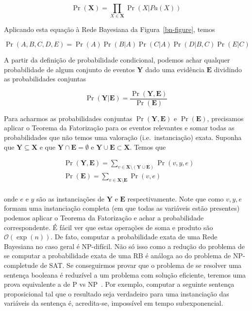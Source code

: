 \documentclass{amsart}
\theoremstyle{plain}
\numberwithin{equation}{subsection}
\newcommand{\set}[1]{\mathbf{#1}}
\newcommand{\bigo}{\mathcal{O}}
\begin{document}
\begin{equation*}
  \Pr(\set{X}) = \prod_{X\in\set{X}} \Pr(X|Pa(X))
\end{equation*}

Aplicando esta equação à Rede Bayesiana da Figura~\ref{bn-figure}, temos

\begin{equation*}
  \Pr(A,B,C,D,E) = \Pr(A)\Pr(B|A)\Pr(C|A)\Pr(D|B,C)\Pr(E|C)
\end{equation*}

A partir da definição de probabilidade condicional, podemos achar qualquer probabilidade de algum
conjunto de eventos $\set{Y}$ dado uma evidência $\set{E}$ dividindo as probabilidades conjuntas

\begin{equation*}
  \Pr(\set{Y}|\set{E}) = \frac{\Pr(\set{Y},\set{E})}{\Pr(\set{E})}
\end{equation*}

Para acharmos as probabilidades conjuntas $\Pr(\set{Y},\set{E})$ e $\Pr(\set{E})$, precisamos
aplicar o Teorema da Fatorização para os eventos relevantes e somar todas as probabilidades que não
temos uma valoração (i.e.\ instanciação) exata. Suponha que $\set{Y}\subseteq\set{X}$ e que
$\set{Y}\cap\set{E}=\emptyset$ e $\set{Y}\cup\set{E}\subset\set{X}$. Temos que

\begin{align*}
  &\Pr(\set{Y},\set{E})=\sum_{v\in\set{X}\setminus(\set{Y}\cup\set{E})} \Pr(v,y,e)\\
  &\Pr(\set{E})=\sum_{v\in\set{X}\setminus\set{E}} \Pr(v,e)\\
\end{align*}

onde $e$ e $y$ são as instanciações de $\set{Y}$ e $\set{E}$ respectivamente. Note que como $v,y,e$
formam uma instanciação completa (em que todas as variáveis estão presentes) podemos aplicar o
Teorema da Fatorização e achar a probabilidade correspondente. É fácil ver que estas operações de
soma e produto são $\bigo(\exp(n))$. De fato, computar a probabilidade exata de uma Rede Bayesiana
no caso geral é NP-difícil. Não só isso como a redução do problema de se computar a probabilidade
exata de uma RB é análoga ao do problema de NP-completude de SAT\@. Se conseguirmos provar que o
problema de se resolver uma sentença booleana é reduzível a um problema com solução eficiente,
teremos uma prova equivalente a de P vs NP~\cite{np-sat}. Por exemplo, computar a seguinte sentença
proposicional tal que o resultado seja verdadeiro para uma instanciação das variáveis da sentença
é, acredita-se, impossível em tempo subexponencial.
\end{document}
